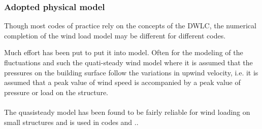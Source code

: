 \subsubsection{Adopted physical model}
Though most codes of practice rely on the concepts of the DWLC, the numerical completion of the wind load model may be different for different codes.  

Much effort has been put to put it into model. Often for the modeling of the fluctuations and such the quati-steady wind model where it is assumed that the pressures on the building surface follow  the variations in upwind velocity, i.e. it is assumed that a peak value of wind speed is accompanied by a peak value of pressure or load on the structure. \\
\\
The quasisteady model has been found to be fairly reliable for wind loading on small structures and is used in codes and .. \\

